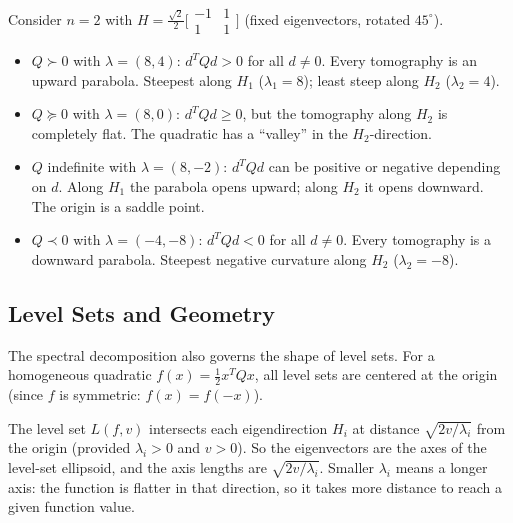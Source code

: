 \begin{exm}\label{exm:quad-tomographies}
	Consider $n = 2$ with $H = \frac{\sqrt{2}}{2}\bigl[\begin{smallmatrix} -1 & 1 \\ 1 & 1 \end{smallmatrix}\bigr]$ (fixed eigenvectors, rotated $45^\circ$).
	\begin{itemize}
		\item $Q \succ 0$ with $\lambda = (8, 4)$: $d^T Q d > 0$ for all $d \neq 0$.
			Every tomography is an upward parabola.
			Steepest along $H_1$ ($\lambda_1 = 8$); least steep along $H_2$ ($\lambda_2 = 4$).
		\item $Q \succeq 0$ with $\lambda = (8, 0)$: $d^T Q d \geq 0$, but the tomography along $H_2$ is completely flat.
			The quadratic has a ``valley'' in the $H_2$-direction.
		\item $Q$ indefinite with $\lambda = (8, -2)$: $d^T Q d$ can be positive or negative depending on $d$.
			Along $H_1$ the parabola opens upward; along $H_2$ it opens downward.
			The origin is a saddle point.
		\item $Q \prec 0$ with $\lambda = (-4, -8)$: $d^T Q d < 0$ for all $d \neq 0$.
			Every tomography is a downward parabola.
			Steepest negative curvature along $H_2$ ($\lambda_2 = -8$).
	\end{itemize}
\end{exm}


\subsection{Level Sets and Geometry}\label{ssec:level-sets}

The spectral decomposition also governs the shape of level sets.
For a homogeneous quadratic $f(x) = \frac{1}{2} x^T Q x$, all level sets are centered at the origin (since $f$ is symmetric: $f(x) = f(-x)$).

The level set $L(f, v)$ intersects each eigendirection $H_i$ at distance $\sqrt{2v / \lambda_i}$ from the origin (provided $\lambda_i > 0$ and $v > 0$).
So the eigenvectors are the axes of the level-set ellipsoid, and the axis lengths are $\sqrt{2v / \lambda_i}$.
Smaller $\lambda_i$ means a longer axis: the function is flatter in that direction, so it takes more distance to reach a given function value.

